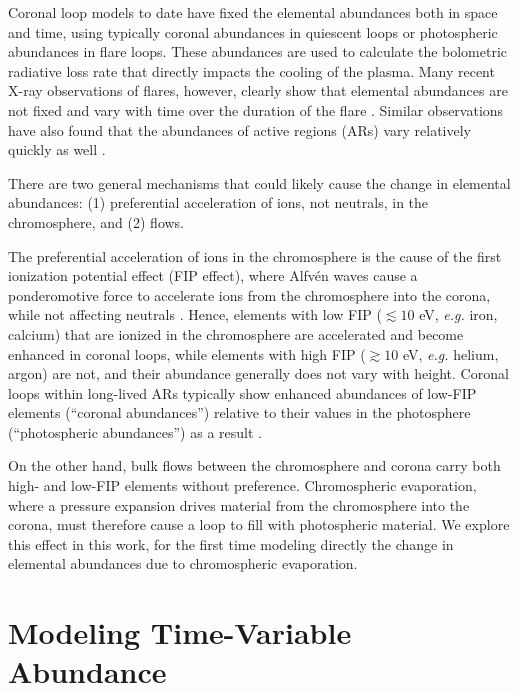 \documentclass[twocolumn]{aastex631}
\begin{document}
Coronal loop models to date have fixed the elemental abundances both in space and time, using typically coronal abundances in quiescent loops or photospheric abundances in flare loops.  These abundances are used to calculate the bolometric radiative loss rate that directly impacts the cooling of the plasma.  Many recent X-ray observations of flares, however, clearly show that elemental abundances are not fixed and vary with time over the duration of the flare \citep{mondal2021, delzanna2021, mithun2022, nama2023, suarez2023, woods2023, rao2023, kepa2023}.  Similar observations have also found that the abundances of active regions (ARs) vary relatively quickly as well \citep{mondal2023}.

There are two general mechanisms that could likely cause the change in elemental abundances: (1) preferential acceleration of ions, not neutrals, in the chromosphere, and (2) flows.  

The preferential acceleration of ions in the chromosphere is the cause of the first ionization potential effect (FIP effect), where Alfv\'en waves cause a ponderomotive force to accelerate ions from the chromosphere into the corona, while not affecting neutrals \citep{laming2015,laming2021}.  Hence, elements with low FIP ($\lesssim 10$ eV, \textit{e.g.} iron, calcium) that are ionized in the chromosphere are accelerated and become enhanced in coronal loops, while elements with high FIP ($\gtrsim 10$ eV, \textit{e.g.} helium, argon) are not, and their abundance generally does not vary with height.  Coronal loops within long-lived ARs typically show enhanced abundances of low-FIP elements (``coronal abundances'') relative to their values in the photosphere (``photospheric abundances'') as a result \citep{pottasch1964,mckenzie1992,delzanna2003,delzanna2014}.  

On the other hand, bulk flows between the chromosphere and corona carry both high- and low-FIP elements without preference.  Chromospheric evaporation, where a pressure expansion drives material from the chromosphere into the corona, must therefore cause a loop to fill with photospheric material.  We explore this effect in this work, for the first time modeling directly the change in elemental abundances due to chromospheric evaporation.  

\section{Modeling Time-Variable Abundance}
\end{document}
